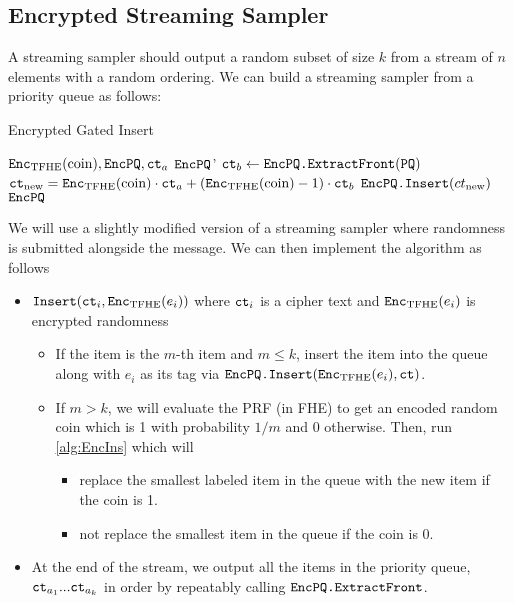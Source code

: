 \subsection*{Encrypted Streaming Sampler}
A streaming sampler should output a random subset of size $k$ from a stream of $n$ elements with a random ordering.
We can build a streaming sampler from a priority queue as follows:


\begin{algorithm}
	\caption{Encrypted Gated Insert}
	\label{alg:EncIns}
	\begin{algorithmic}
		\Require $\texttt{Enc}_{\mathrm{TFHE}}(\text{coin}), \texttt{EncPQ}, \texttt{ct}_a$
		\Ensure $\texttt{EncPQ}$'
		\State $\texttt{ct}_b \gets \texttt{EncPQ.ExtractFront}(\texttt{PQ})$
		\State $\texttt{ct}_{\text{new}} = \texttt{Enc}_{\mathrm{TFHE}}(\text{coin}) \cdot \texttt{ct}_a + (\texttt{Enc}_{\mathrm{TFHE}}(\text{coin}) - 1) \cdot \texttt{ct}_b$
		\State $\texttt{EncPQ.Insert}(ct_{\text{new}})$
		\State \Return $\texttt{EncPQ}$
	\end{algorithmic}
\end{algorithm}

We will use a slightly modified version of a streaming sampler where randomness is submitted alongside the message.
We can then implement the algorithm as follows
\begin{itemize}
	\item $\texttt{Insert}(\texttt{ct}_i, \texttt{Enc}_{\mathrm{TFHE}}(e_i))$ where $\texttt{ct}_i$ is a cipher text and $\texttt{Enc}_{\mathrm{TFHE}}(e_i)$ is encrypted randomness
	\begin{itemize}
		\item If the item is the $m$-th item and $m \leq k$, insert the item into the queue along with $e_i$ as its tag via $\texttt{EncPQ.Insert}(\texttt{Enc}_{\mathrm{TFHE}}(e_i), \texttt{ct})$.
		\item If $m > k$, we will evaluate the PRF (in FHE) to get an encoded random coin which is 1 with probability $1/m$ and 0 otherwise.
		Then, run \cref{alg:EncIns} which will
		\begin{itemize}
			\item replace the smallest labeled item in the queue with the new item if the coin is 1.
			\item not replace the smallest item in the queue if the coin is 0.
		\end{itemize}
	\end{itemize}

	\item At the end of the stream, we output all the items in the priority queue, $\texttt{ct}_{a_1} ... \texttt{ct}_{a_k}$ in order
	 by repeatably calling $\texttt{EncPQ.ExtractFront}$.
	
\end{itemize}

